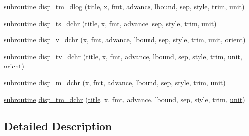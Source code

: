 \begin{DoxyCompactItemize}
\item 
\hyperlink{M__stopwatch_83_8txt_acfbcff50169d691ff02d4a123ed70482}{subroutine} \hyperlink{interfacem__display_1_1disp_aafa67eb4fe1a2a3f76fc10b3214c2269}{disp\+\_\+tm\+\_\+dlog} (\hyperlink{print__watch_83_8txt_a15b5bd21156bb9fca6a755ab8c029a9c}{title}, x, fmt, advance, lbound, sep, style, trim, \hyperlink{M__stopwatch_83_8txt_a5cbef30eb7c0d734bd82f5a7ebea9aa7}{unit})
\item 
\hyperlink{M__stopwatch_83_8txt_acfbcff50169d691ff02d4a123ed70482}{subroutine} \hyperlink{interfacem__display_1_1disp_ae947bf00ff1ff45a9e5bfb482037dc95}{disp\+\_\+ts\+\_\+dchr} (\hyperlink{print__watch_83_8txt_a15b5bd21156bb9fca6a755ab8c029a9c}{title}, x, fmt, advance, sep, style, trim, \hyperlink{M__stopwatch_83_8txt_a5cbef30eb7c0d734bd82f5a7ebea9aa7}{unit})
\item 
\hyperlink{M__stopwatch_83_8txt_acfbcff50169d691ff02d4a123ed70482}{subroutine} \hyperlink{interfacem__display_1_1disp_a518ee98d731f5122483ea0bb63eb961f}{disp\+\_\+v\+\_\+dchr} (x, fmt, advance, lbound, sep, style, trim, \hyperlink{M__stopwatch_83_8txt_a5cbef30eb7c0d734bd82f5a7ebea9aa7}{unit}, orient)
\item 
\hyperlink{M__stopwatch_83_8txt_acfbcff50169d691ff02d4a123ed70482}{subroutine} \hyperlink{interfacem__display_1_1disp_aded19eaf08c73501dd5edc28a0206355}{disp\+\_\+tv\+\_\+dchr} (\hyperlink{print__watch_83_8txt_a15b5bd21156bb9fca6a755ab8c029a9c}{title}, x, fmt, advance, lbound, sep, style, trim, \hyperlink{M__stopwatch_83_8txt_a5cbef30eb7c0d734bd82f5a7ebea9aa7}{unit}, orient)
\item 
\hyperlink{M__stopwatch_83_8txt_acfbcff50169d691ff02d4a123ed70482}{subroutine} \hyperlink{interfacem__display_1_1disp_a1492ca030b6ec831ef1783ff0d34e26b}{disp\+\_\+m\+\_\+dchr} (x, fmt, advance, lbound, sep, style, trim, \hyperlink{M__stopwatch_83_8txt_a5cbef30eb7c0d734bd82f5a7ebea9aa7}{unit})
\item 
\hyperlink{M__stopwatch_83_8txt_acfbcff50169d691ff02d4a123ed70482}{subroutine} \hyperlink{interfacem__display_1_1disp_aea7c2a4003cee7438d14182f4b5577a7}{disp\+\_\+tm\+\_\+dchr} (\hyperlink{print__watch_83_8txt_a15b5bd21156bb9fca6a755ab8c029a9c}{title}, x, fmt, advance, lbound, sep, style, trim, \hyperlink{M__stopwatch_83_8txt_a5cbef30eb7c0d734bd82f5a7ebea9aa7}{unit})
\end{DoxyCompactItemize}


\subsection{Detailed Description}
